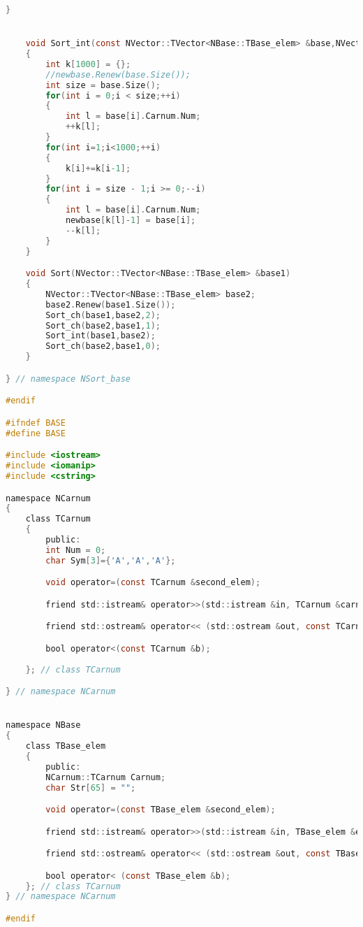 \begin{lstlisting}[language=C]
    }


    void Sort_int(const NVector::TVector<NBase::TBase_elem> &base,NVector::TVector<NBase::TBase_elem> &newbase)
    {
        int k[1000] = {};
        //newbase.Renew(base.Size());
        int size = base.Size();
        for(int i = 0;i < size;++i)
        {
            int l = base[i].Carnum.Num;
            ++k[l];
        }
        for(int i=1;i<1000;++i)
        {
            k[i]+=k[i-1];
        }
        for(int i = size - 1;i >= 0;--i)
        {
            int l = base[i].Carnum.Num;
            newbase[k[l]-1] = base[i];
            --k[l];
        }
    }

    void Sort(NVector::TVector<NBase::TBase_elem> &base1)
    {
        NVector::TVector<NBase::TBase_elem> base2;
        base2.Renew(base1.Size());
        Sort_ch(base1,base2,2);
        Sort_ch(base2,base1,1);
        Sort_int(base1,base2);
        Sort_ch(base2,base1,0);
    }

} // namespace NSort_base

#endif

#ifndef BASE
#define BASE

#include <iostream>
#include <iomanip>
#include <cstring>

namespace NCarnum
{
    class TCarnum
    {
        public:
        int Num = 0;
        char Sym[3]={'A','A','A'};

        void operator=(const TCarnum &second_elem);

        friend std::istream& operator>>(std::istream &in, TCarnum &carnum);

        friend std::ostream& operator<< (std::ostream &out, const TCarnum &carnum);

        bool operator<(const TCarnum &b);
        
    }; // class TCarnum

} // namespace NCarnum


namespace NBase
{
    class TBase_elem
    {
        public:
        NCarnum::TCarnum Carnum;
        char Str[65] = "";

        void operator=(const TBase_elem &second_elem);

        friend std::istream& operator>>(std::istream &in, TBase_elem &elem);

        friend std::ostream& operator<< (std::ostream &out, const TBase_elem &elem);

        bool operator< (const TBase_elem &b);
    }; // class TCarnum
} // namespace NCarnum

#endif
\end{lstlisting}


